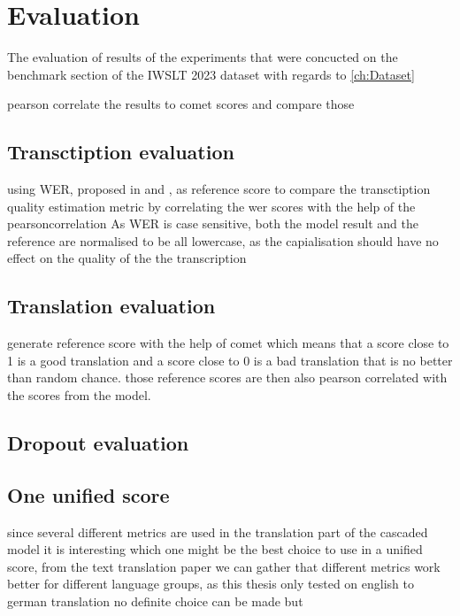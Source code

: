 
\chapter{Evaluation}
\label{ch:Evaluation}
The evaluation of results of the experiments that were concucted on the benchmark section of the IWSLT 2023 dataset \cite{sperber2024evaluating} with regards to \ref{ch:Dataset}

pearson correlate \cite{2020SciPy-NMeth} the results to comet scores and compare those 


\section{Transctiption evaluation}


using WER, proposed in \cite{woodard1982} and \cite{morris2004}, as reference score to compare the transctiption quality estimation metric by correlating the wer scores with the help of the pearsoncorrelation \cite{2020SciPy-NMeth}
As WER is case sensitive, both the model result and the reference are normalised to be all lowercase, as the capialisation should have no effect on the quality of the the transcription

\section{Translation evaluation}

generate reference score with the help of comet \cite{rei-etal-2020-comet} which means that a score close to 1 is a good translation and a score close to 0 is a bad translation that is no better than random chance.
those reference scores are then also pearson correlated with the scores from the model. 

\section{Dropout evaluation}



\section{One unified score}
since several different metrics are used in the translation part of the cascaded model it is interesting which one might be the best choice to use in a unified score, from the text translation paper \cite{fomicheva2020unsupervised} we can gather that different metrics work better for different language groups, as this thesis only tested on english to german translation no definite choice can be made but %



